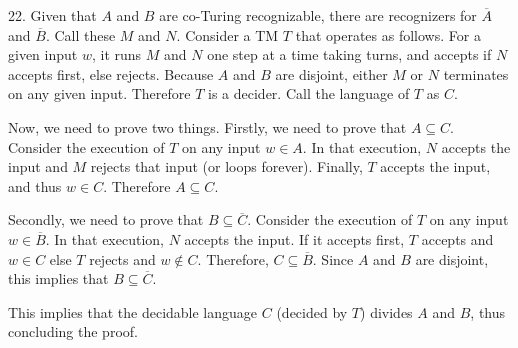 \documentclass{article}
\begin{document}
22. Given that $A$ and $B$ are co-Turing recognizable, there are recognizers for $\overline{A}$ and $\overline{B}$. Call these $M$ and $N$. Consider a TM $T$ that operates as follows. For a given input $w$, it runs $M$ and $N$ one step at a time taking turns, and accepts if $N$ accepts first, else rejects. Because $A$ and $B$ are disjoint, either $M$ or $N$ terminates on any given input. Therefore $T$ is a decider. Call the language of $T$ as $C$.

Now, we need to prove two things. Firstly, we need to prove that $A \subseteq C$. Consider the execution of $T$ on any input $w \in A$. In that execution, $N$ accepts the input and $M$ rejects that input (or loops forever). Finally, $T$ accepts the input, and thus $w \in C$. Therefore $A \subseteq C$.

Secondly, we need to prove that $B \subseteq \overline{C}$. Consider the execution of $T$ on any input $w \in \overline{B}$. In that execution, $N$ accepts the input. If it accepts first, $T$ accepts and $w \in C$ else $T$ rejects and $w \notin C$. Therefore, $C \subseteq \overline{B}$. Since $A$ and $B$ are disjoint, this implies that $B \subseteq \overline{C}$.

This implies that the decidable language $C$ (decided by $T$) divides $A$ and $B$, thus concluding the proof.
\end{document}

